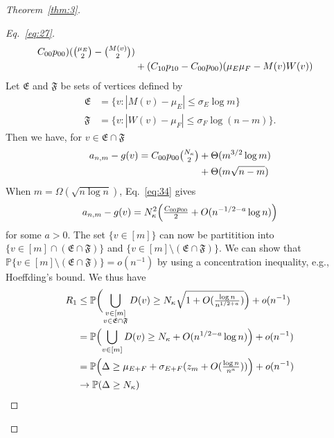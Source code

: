 \documentclass[draftcls]{IEEEtran}
\theoremstyle{definition}
\begin{document}
\begin{proof}[Theorem~\ref{thm:3}]
\begin{proof}[Eq.~\eqref{eq:27}]
\begin{equation*}
\begin{split}
  C_{00} p_{00})(\tbinom{\mu_E}{2} - \tbinom{M(v)}{2})
  \\ &+ (C_{10} p_{10} - C_{00} p_{00})(\mu_E\mu_F - M(v)W(v))
  \end{split}
\end{equation*}
Let $\mathfrak{E}$ and $\mathfrak{F}$ be sets of vertices defined by
\begin{align}
\mathfrak{E} &=
\{v \colon |M(v) - \mu_E| \leq \sigma_E \log{m}\} \\ \mathfrak{F} &=
\{v \colon |W(v) - \mu_F| \leq \sigma_F \log{(n-m)}\}.
\end{align}
Then we have, for $v \in \mathfrak{E} \cap \mathfrak{F}$
\begin{equation}
  \label{eq:34}
  \begin{split}
  a_{n,m} - g(v) =  C_{00} p_{00} \tbinom{N_\kappa}{2} &+
  \Theta(m^{3/2} \log{m}) \\ &+ 
  \Theta(m \sqrt{n - m}) \\
  \end{split}
\end{equation}
When $m = \Omega(\sqrt{n \log n})$, Eq.~\eqref{eq:34} gives
\begin{equation}
  \label{eq:35}
  a_{n,m} - g(v) = N_{\kappa}^{2}\Bigl(\tfrac{C_{00}p_{00}}{2} + O(n^{-1/2 - a}
  \log{n})\Bigr)
\end{equation}
for some $a > 0$. The set $\{v \in [m]\}$ can now be partitition into
$\{v \in [m] \cap (\mathfrak{E} \cap\mathfrak{F})\}$ and $\{v \in [m]
\setminus (\mathfrak{E} \cap \mathfrak{F})\}$. We can show that
$\mathbb{P}\{v \in [m] \setminus (\mathfrak{E} \cap \mathfrak{F})\} =
o(n^{-1})$ by using a concentration inequality, e.g., Hoeffding's
bound. We thus have
\begin{equation}
  \label{eq:37}
  \begin{split}
    R_1 &\leq \mathbb{P}\biggl( \bigcup_{\substack{v \in [m] \\ v
        \in \mathfrak{E} \cap \mathfrak{F}}} D(v) \geq
    N_{\kappa} \sqrt{1 + O(\tfrac{\log{n}}{n^{1/2+a}})} \Bigr) + o(n^{-1}) \\
    & = \mathbb{P}\Bigl(\bigcup_{v \in [m]} D(v) \geq N_\kappa +
    O(n^{1/2 - a} \log{n})\Bigr) + o(n^{-1}) \\
    &= \mathbb{P}\Bigl(\Delta \geq \mu_{E+F} +
    \sigma_{E+F}(z_m + O(\tfrac{\log{n}}{n^{a}}))\Bigr) + o(n^{-1}) \\ 
    & \rightarrow \mathbb{P}(\Delta \geq N_{\kappa})
    \end{split}
\end{equation}

\end{proof}
\end{proof}
\end{document}
